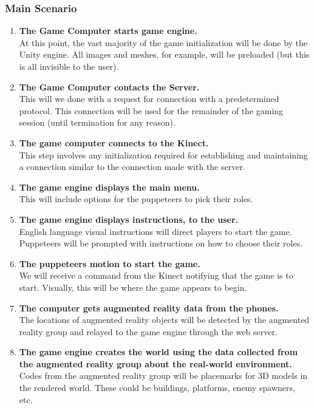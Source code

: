 \documentclass[10pt,letterpaper,oneside,english]{report}
\begin{document}
	\subsubsection{Main Scenario}
	\begin{enumerate}
		\item \textbf{The Game Computer starts game engine.} \\ At this point, the vast majority of the game initialization will be done by the Unity engine. All images and meshes, for example, will be preloaded (but this is all invisible to the user).
		\item \textbf{The Game Computer contacts the Server.} \\ This will we done with a request for connection with a predetermined protocol. This connection will be used for the remainder of the gaming session (until termination for any reason).
		\item \textbf{The game computer connects to the Kinect.} \\ This step involves any initialization required for establishing and maintaining a connection similar to the connection made with the server.
		\item \textbf{The game engine displays the main menu.} \\ This will include options for the puppeteers to pick their roles.
		\item \textbf{The game engine displays instructions, to the user.} \\ English language visual instructions will direct players to start the game. Puppeteers will be prompted with instructions on how to choose their roles.
		\item \textbf{The puppeteers motion to start the game.} \\ We will receive a command from the Kinect notifying that the game is to start. Visually, this will be where the game appears to begin.
		\item \textbf{The computer gets augmented reality data from the phones.} \\ The locations of augmented reality objects will be detected by the augmented reality group and relayed to the game engine through the web server.
		\item \textbf{The game engine creates the world using the data collected from the augmented reality group about the real-world environment.} \\ Codes from the augmented reality group will be placemarks for 3D models in the rendered world. These could be buildings, platforms, enemy spawners, etc.

\end{enumerate}
\end{document}
